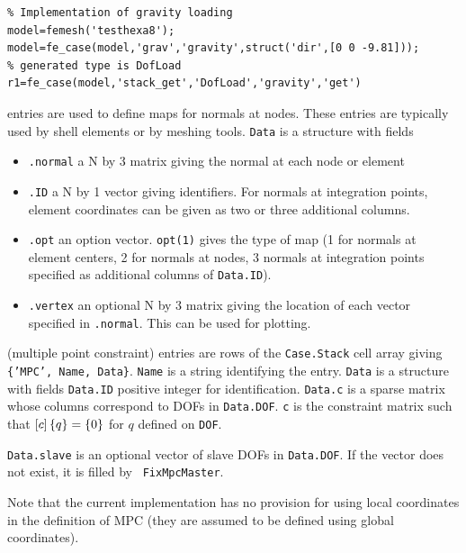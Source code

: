 \begin{verbatim}
% Implementation of gravity loading
model=femesh('testhexa8');
model=fe_case(model,'grav','gravity',struct('dir',[0 0 -9.81]));
% generated type is DofLoad
r1=fe_case(model,'stack_get','DofLoad','gravity','get')
\end{verbatim} %


 entries are used to define maps for normals at nodes. These entries are typically used by shell elements or by meshing tools. {\tt Data} is a structure with fields

\begin{itemize}
 \item {\tt .normal} a N by 3 matrix giving the normal at each node or element
 \item {\tt .ID} a N by 1 vector giving identifiers. For normals at integration points, element coordinates can be given as two or three additional columns.
 \item {\tt .opt} an option vector. {\tt opt(1)} gives the type of map (1 for normals at element centers, 2 for normals at nodes, 3 normals at integration points specified as additional columns of {\tt Data.ID}).
 \item {\tt .vertex} an optional N by 3 matrix giving the location of each vector specified in {\tt .normal}. This can be used for plotting. 
\end{itemize}


 (multiple point constraint) entries are rows of the {\tt Case.Stack} cell array giving {\tt \{'MPC', Name, Data\}}. {\tt Name} is a string identifying the entry. {\tt Data} is a structure with fields {\tt Data.ID} positive integer for identification. {\tt Data.c} is a sparse matrix whose columns correspond to DOFs in {\tt Data.DOF}. {\tt c} is the constraint matrix such that $\left[c\right] \left\{q\right\} = \left\{0\right\}$ for $q$ defined on {\tt DOF}.

{\tt Data.slave} is an optional vector of slave DOFs in {\tt Data.DOF}. If the vector does not exist, it is filled by \feutil\ {\tt FixMpcMaster}.

Note that the current implementation has no provision for using local coordinates in the definition of MPC (they are assumed to be defined using global coordinates).

